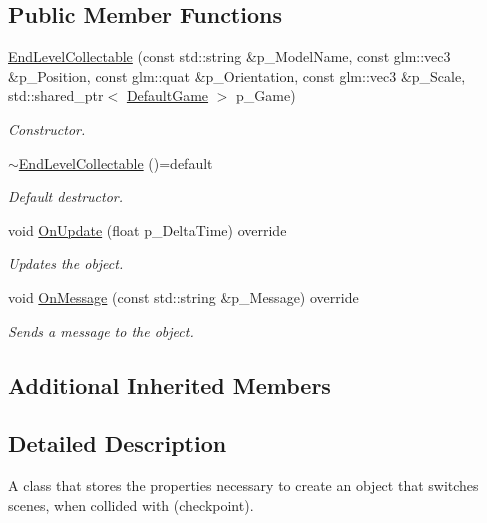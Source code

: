 \subsection*{Public Member Functions}
\begin{DoxyCompactItemize}
\item 
\mbox{\hyperlink{class_end_level_collectable_aab33bc117864056954cfe06477e3f506}{End\+Level\+Collectable}} (const std\+::string \&p\+\_\+\+Model\+Name, const glm\+::vec3 \&p\+\_\+\+Position, const glm\+::quat \&p\+\_\+\+Orientation, const glm\+::vec3 \&p\+\_\+\+Scale, std\+::shared\+\_\+ptr$<$ \mbox{\hyperlink{class_default_game}{Default\+Game}} $>$ p\+\_\+\+Game)
\begin{DoxyCompactList}\small\item\em Constructor. \end{DoxyCompactList}\item 
\mbox{\label{class_end_level_collectable_a50935b7356fceab619380949d5795543}} 
\mbox{\hyperlink{class_end_level_collectable_a50935b7356fceab619380949d5795543}{$\sim$\+End\+Level\+Collectable}} ()=default
\begin{DoxyCompactList}\small\item\em Default destructor. \end{DoxyCompactList}\item 
void \mbox{\hyperlink{class_end_level_collectable_a6d04aaa0751a21b0d4922339d6524887}{On\+Update}} (float p\+\_\+\+Delta\+Time) override
\begin{DoxyCompactList}\small\item\em Updates the object. \end{DoxyCompactList}\item 
void \mbox{\hyperlink{class_end_level_collectable_aabbe03b0e87e7dbc04948b022f399de0}{On\+Message}} (const std\+::string \&p\+\_\+\+Message) override
\begin{DoxyCompactList}\small\item\em Sends a message to the object. \end{DoxyCompactList}\end{DoxyCompactItemize}
\subsection*{Additional Inherited Members}


\subsection{Detailed Description}
A class that stores the properties necessary to create an object that switches scenes, when collided with (checkpoint). 

